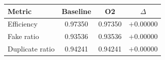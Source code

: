 \renewcommand{\arraystretch}{1.4}
\begin{tabular}{lccc}
\toprule
Metric & Baseline & O2 & $\Delta$ \\
\midrule
Efficiency & 0.97350 & 0.97350 & $+0.00000$ \\
\rowcolor{gray!15}
Fake ratio & 0.93536 & 0.93536 & $+0.00000$ \\
Duplicate ratio & 0.94241 & 0.94241 & $+0.00000$ \\
\bottomrule
\end{tabular}
